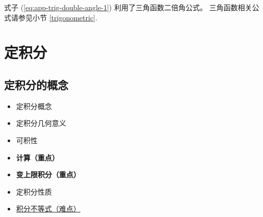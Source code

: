 式子 (\ref{eq:app-trig-double-angle-1}) 利用了三角函数二倍角公式。
三角函数相关公式请参见小节 \ref{trigonometric}.

\section{定积分}\label{finite-integral}

\subsection{定积分的概念}\label{concept-of-definite-integral}

\begin{itemize}
    \item 定积分概念
    \item 定积分几何意义
    \item 可积性
    \item \textbf{计算（重点）}
    \item \textbf{变上限积分（重点）}
    \item 定积分性质
    \item \underline{积分不等式（难点）}
\end{itemize}

